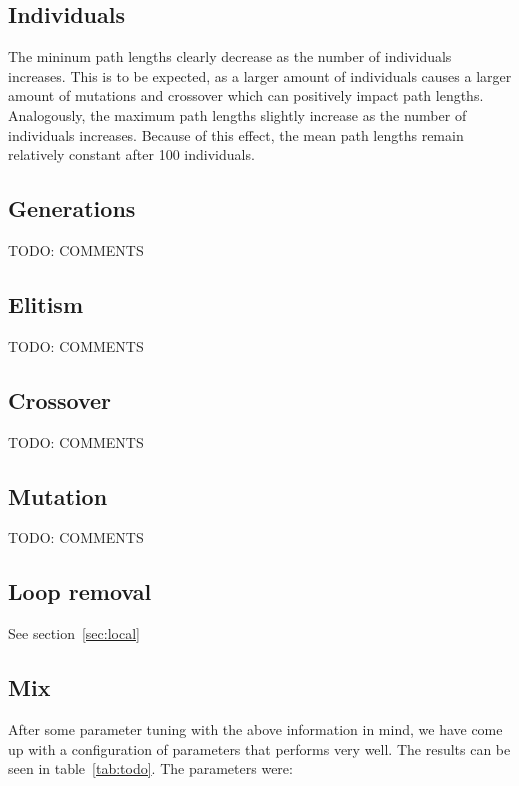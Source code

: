 \documentclass{report}
\begin{document}
\subsection{Individuals}
The mininum path lengths clearly decrease as the number of individuals increases. This is to be expected, as a larger amount of individuals causes a larger amount of mutations and crossover which can positively impact path lengths. Analogously, the maximum path lengths slightly increase as the number of individuals increases. Because of this effect, the mean path lengths remain relatively constant after 100 individuals.

\subsection{Generations}
TODO: COMMENTS

\subsection{Elitism}
TODO: COMMENTS

\subsection{Crossover}
TODO: COMMENTS

\subsection{Mutation}
TODO: COMMENTS

\subsection{Loop removal}
See section~\ref{sec:local}

\subsection{Mix}
After some parameter tuning with the above information in mind, we have come up with a configuration of parameters that performs very well. The results can be seen in table~\ref{tab:todo}. The parameters were: 
\end{document}
